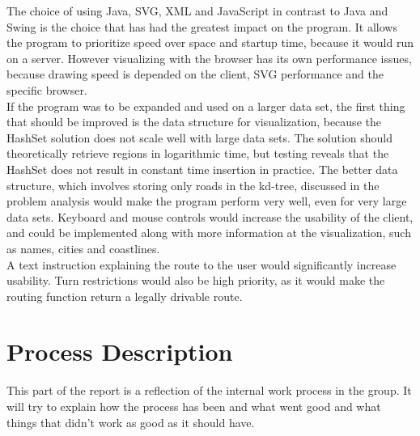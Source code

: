 \documentclass[a4paper,10pt,titlepage]{article}
\begin{document}
The choice of using Java, SVG, XML and JavaScript in contrast to Java and Swing is the choice that has had the greatest impact on the program. It allows the program to prioritize speed over space and startup time, because it would run on a server. However visualizing with the browser has its own performance issues, because drawing speed is depended on the client, SVG performance and the specific browser.\\
If the program was to be expanded and used on a larger data set, the first thing that should be improved is the data structure for visualization, because the HashSet solution does not scale well with large data sets. The solution should theoretically retrieve regions in logarithmic time, but testing reveals that the HashSet does not result in constant time insertion in practice. The better data structure, which involves storing only roads in the kd-tree, discussed in the problem analysis would make the program perform very well, even for very large data sets. Keyboard and mouse controls would increase the usability of the client, and could be implemented along with more information at the visualization, such as names, cities and coastlines.\\
A text instruction explaining the route to the user would significantly increase usability.  Turn restrictions would also be high priority, as it would make the routing function return a legally drivable route.\\
 		
		\newpage

	\section{Process Description}
	This part of the report is a reflection of the internal work process in the group. It will try to explain how the process has been and what went good and what things that didn't work as good as it should have.
	
\end{document}
